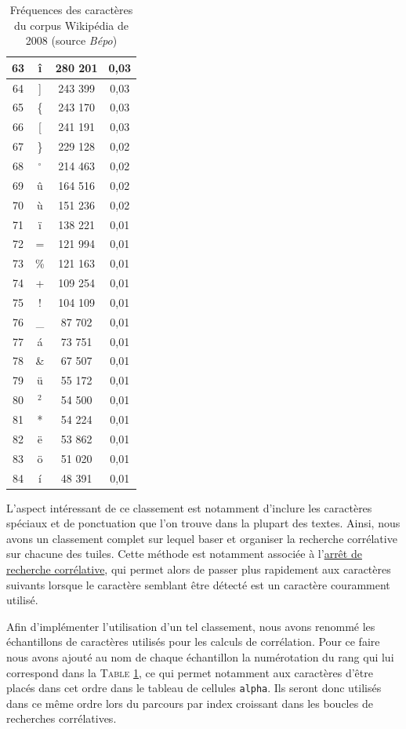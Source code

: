 \documentclass[a4paper,12pt,titlepage]{report}
\begin{document}
\begin{table}[h!]
\begin{tabular}{|c|c|c|c|}
\hline
63 & î & 	280 201 & 0,03 \\
\hline
64 & ] &	243 399 & 0,03 \\
\hline
65 &\{ &	243 170 & 0,03 \\
\hline
66 & [ &	241 191 & 0,03 \\
\hline
67 &\} &	229 128 & 0,02 \\
\hline
68 &$^\circ$&214 463& 0,02 \\
\hline
69 & û &    164 516 & 0,02 \\
\hline
70 & ù &	151 236 & 0,02 \\
\hline
71 & ï &	138 221 & 0,01 \\
\hline
72 & = &	121 994 & 0,01 \\
\hline
73 &\% &	121 163 & 0,01 \\
\hline
74 & + &	109 254 & 0,01 \\
\hline
75 & ! &	104 109 & 0,01 \\
\hline
76 &\_ &	 87 702 & 0,01 \\
\hline
77 & á &	 73 751 & 0,01 \\
\hline
78 &\& &	 67 507 & 0,01 \\
\hline
79 & ü & 	 55 172 & 0,01 \\
\hline
80 &$^2$& 	 54 500 & 0,01 \\
\hline
81 & * &	 54 224 & 0,01 \\
\hline
82 & ë & 	 53 862 & 0,01 \\
\hline
83 & ö & 	 51 020 & 0,01 \\
\hline
84 & í &	 48 391 & 0,01 \\ 
\hline
\end{tabular}
\label{freq_carac}
\caption{Fréquences des caractères du corpus Wikipédia de 2008 (source \textit{Bépo})}
\end{table}	

\newpage

L'aspect intéressant de ce classement est notamment d'inclure les caractères spéciaux et de ponctuation que l'on trouve dans la plupart des textes. Ainsi, nous avons un classement complet sur lequel baser et organiser la recherche corrélative sur chacune des tuiles. Cette méthode est notamment associée à l'\hyperref[stop_cor]{arrêt de recherche corrélative}, qui permet alors de passer plus rapidement aux caractères suivants lorsque le caractère semblant être détecté est un caractère couramment utilisé.

Afin d'implémenter l'utilisation d'un tel classement, nous avons renommé les échantillons de caractères utilisés pour les calculs de corrélation. Pour ce faire nous avons ajouté au nom de chaque échantillon la numérotation du rang qui lui correspond dans la \textsc{Table \ref{freq_carac}}, ce qui permet notamment aux caractères d'être placés dans cet ordre dans le tableau de cellules \texttt{alpha}. Ils seront donc utilisés dans ce même ordre lors du parcours par index croissant dans les boucles de recherches corrélatives.
\end{document}

